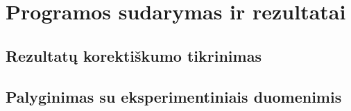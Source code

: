 \section{Programos sudarymas ir rezultatai}
\subsection{Rezultatų korektiškumo tikrinimas}
\subsection{Palyginimas su eksperimentiniais duomenimis}
